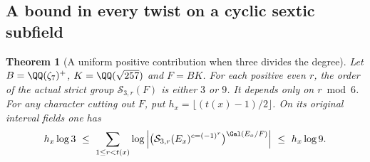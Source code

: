 \documentclass[a4paper,11pt]{article}
\newtheorem{theorem}[proposition]{Theorem}
\theoremstyle{definition}
\theoremstyle{remark}
\numberwithin{equation}{section}
\begin{document}
\subsection{A bound in every twist on a cyclic sextic subfield}\label{nav:I-62}
\begin{theorem}[A uniform positive contribution when three divides the degree]\leavevmode
\label{thm:sextic278}
Let \(B=\QQ(\zeta_7)^+\), \(K=\QQ(\sqrt{257})\) and \(F=BK\).
For each positive even \(r\), the order of the actual strict
group \(\mathcal S_{3,r}(F)\) is either \(3\) or \(9\).
It depends only on \(r\bmod6\). For any character cutting out
\(F\), put \(h_x=\lfloor(t(x)-1)/2\rfloor\).
On its original interval fields one has
\[
 h_x\log3\ \le\
   \sum_{1\le r<t(x)}
       \log\left|
       \bigl(\mathcal S_{3,r}(E_x)^{c=(-1)^r}\bigr)^{\Gal(E_x/F)}
       \right|
             \ \le\ h_x\log9 .
\]
\end{theorem}
\end{document}
